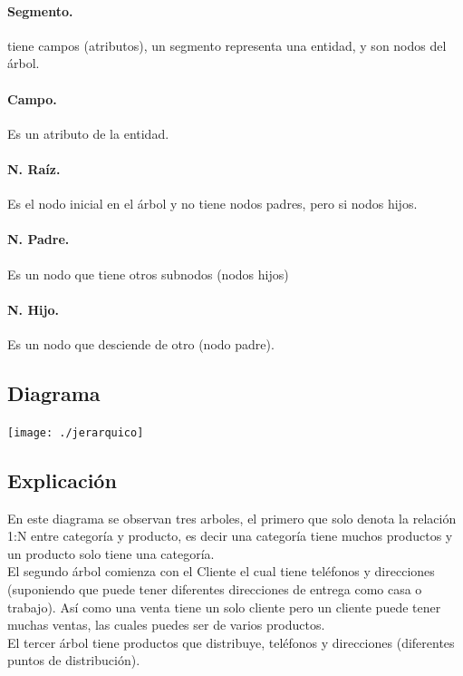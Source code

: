 \documentclass[spanish,12pt,letterpapper]{article}
\begin{document}
	\paragraph{Segmento.} tiene campos (atributos), un segmento representa una entidad, y son nodos del árbol.
	\paragraph{Campo.} Es un atributo de la entidad.	
	\paragraph{N. Raíz.} Es el nodo inicial en el árbol y no tiene nodos padres, pero si nodos hijos.
	\paragraph{N. Padre.} Es un nodo que tiene otros subnodos (nodos hijos)
	\paragraph{N. Hijo.} Es un nodo que desciende de otro (nodo padre).\\
	
	\subsection{Diagrama}
	\begin{center}
	\texttt{[image: ./jerarquico]}~\\[1cm]
	\end{center}
	\pagebreak
	
	\subsection{Explicación}
	
	En este diagrama se observan tres arboles, el primero que solo denota la relación 1:N entre categoría y producto, es decir una categoría tiene muchos productos y un producto solo tiene una categoría.\\
	
	El segundo árbol comienza con el Cliente el cual tiene teléfonos y direcciones (suponiendo que puede tener diferentes direcciones de entrega como casa o trabajo). Así como una venta tiene un solo cliente pero un cliente puede tener muchas ventas, las cuales puedes ser de varios productos.\\
	
	El tercer árbol tiene productos que distribuye, teléfonos y direcciones (diferentes puntos de distribución).\\
	\pagebreak
	
\end{document}
